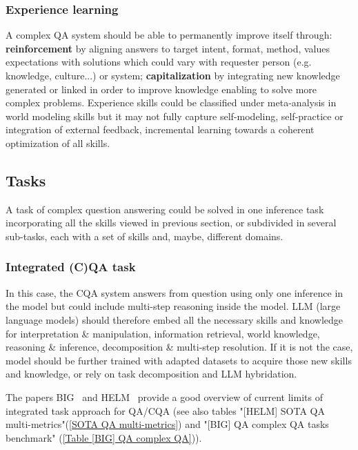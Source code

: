 \documentclass[acmsmall]{acmart}
\begin{document}
\subsubsection{\textbf{Experience learning}}
A complex QA system should be able to permanently improve itself through: \textbf{reinforcement} by aligning answers to target intent, format, method, values expectations with solutions which could vary with requester person (e.g. knowledge, culture...) or system; \textbf{capitalization} by integrating new knowledge generated or linked in order to improve knowledge enabling to solve more complex problems. Experience skills   could be classified under meta-analysis in world modeling skills but it may not fully capture self-modeling, self-practice or  integration of external feedback, incremental learning towards a coherent optimization of all skills.

\subsection{Tasks}\label{sec_tasks}
A task of complex question answering could be solved in one inference task incorporating all the skills viewed in previous section, or subdivided in several sub-tasks, each with a set of skills and, maybe, different domains.

\subsubsection{\textbf{Integrated (C)QA task}}
In this case, the CQA system answers from question using only one inference in the model but could include multi-step reasoning inside the model. LLM (large language models) should therefore embed all the necessary skills and knowledge for interpretation \& manipulation, information retrieval, world knowledge, reasoning \& inference, decomposition \& multi-step resolution. If it is not the case, model should be further trained with adapted datasets to acquire those new skills and knowledge, or rely on task decomposition and LLM hybridation.

The papers BIG~\citep{bigetal.ImitationGameQuantifying2022} and HELM~\citep{liangetal.HolisticEvaluationLanguage2022} provide a good overview of current limits of integrated task approach for QA/CQA (see also tables "[HELM] SOTA QA multi-metrics"(\ref{SOTA QA multi-metrics}) and "[BIG] QA complex QA tasks benchmark" (\autoref{Table [BIG] QA complex QA})).
\end{document}
